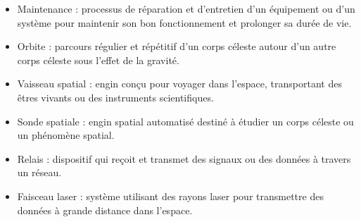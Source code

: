 \documentclass[conference]{IEEEtran}
\begin{document}
\begin{itemize}
\item Maintenance : processus de réparation et d'entretien d'un équipement ou d'un système pour maintenir son bon fonctionnement et prolonger sa durée de vie.
\item Orbite : parcours régulier et répétitif d'un corps céleste autour d'un autre corps céleste sous l'effet de la gravité.
\item Vaisseau spatial : engin conçu pour voyager dans l'espace, transportant des êtres vivants ou des instruments scientifiques.
\item Sonde spatiale : engin spatial automatisé destiné à étudier un corps céleste ou un phénomène spatial.
\item Relais : dispositif qui reçoit et transmet des signaux ou des données à travers un réseau.
\item Faisceau laser : système utilisant des rayons laser pour transmettre des données à grande distance dans l'espace.
\end{itemize}

\clearpage
\end{document}

